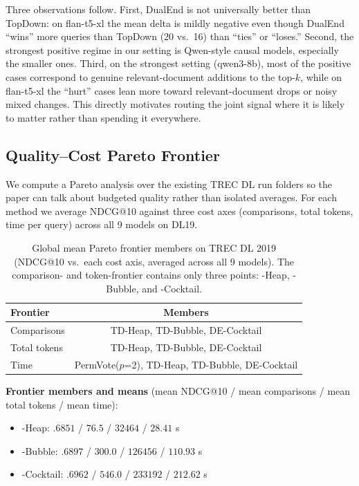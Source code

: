 Three observations follow. First, DualEnd is not universally better than TopDown: on flan-t5-xl the mean delta is mildly negative even though DualEnd ``wins'' more queries than TopDown (20 vs.\ 16) than ``ties'' or ``loses.'' Second, the strongest positive regime in our setting is Qwen-style causal models, especially the smaller ones. Third, on the strongest setting (qwen3-8b), most of the positive cases correspond to genuine relevant-document additions to the top-$k$, while on flan-t5-xl the ``hurt'' cases lean more toward relevant-document drops or noisy mixed changes. This directly motivates routing the joint signal where it is likely to matter rather than spending it everywhere.


\subsection{Quality--Cost Pareto Frontier}
\label{sec:pareto}

We compute a Pareto analysis over the existing TREC DL run folders so the paper can talk about budgeted quality rather than isolated averages. For each method we average NDCG@10 against three cost axes (comparisons, total tokens, time per query) across all 9 models on DL19.

\begin{table}[!htbp]
\caption{Global mean Pareto frontier members on TREC DL 2019 (NDCG@10 vs.\ each cost axis, averaged across all 9 models). The comparison- and token-frontier contains only three points: \topdown{}-Heap, \topdown{}-Bubble, and \dualend{}-Cocktail.}
\label{tab:pareto}
\small
\begin{tabular}{lc}
\toprule
Frontier & Members \\
\midrule
Comparisons & TD-Heap, TD-Bubble, DE-Cocktail \\
Total tokens & TD-Heap, TD-Bubble, DE-Cocktail \\
Time & PermVote($p$=2), TD-Heap, TD-Bubble, DE-Cocktail \\
\bottomrule
\end{tabular}
\end{table}

\textbf{Frontier members and means} (mean NDCG@10 / mean comparisons / mean total tokens / mean time):
\begin{itemize}[leftmargin=*]
\item \topdown{}-Heap: $.6851$ / $76.5$ / $32464$ / $28.41$ s
\item \topdown{}-Bubble: $.6897$ / $300.0$ / $126456$ / $110.93$ s
\item \dualend{}-Cocktail: $.6962$ / $546.0$ / $233192$ / $212.62$ s
\end{itemize}

